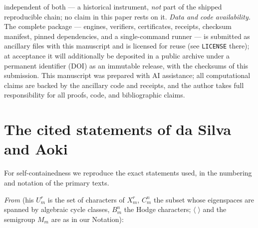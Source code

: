 \documentclass[11pt]{amsart}
\theoremstyle{remark}
\begin{document}
independent of both --- a historical instrument, \emph{not} part of the shipped reproducible
chain; no claim in this paper rests on it. \emph{Data and code availability.} The complete package --- engines, verifiers, certificates,
receipts, checksum manifest, pinned dependencies, and a single-command runner --- is submitted
as ancillary files with this manuscript and is licensed for reuse (see \texttt{LICENSE} there);
at acceptance it will additionally be deposited in a public archive under a permanent
identifier (DOI) as an immutable release, with the checksums of this submission. This
manuscript was prepared with AI assistance; all computational claims are backed by the
ancillary code and receipts, and the author takes full responsibility for all proofs, code, and
bibliographic claims.

\appendix
\section{The cited statements of da Silva and Aoki}\label{app:aoki}

For self-containedness we reproduce the exact statements used, in the numbering and notation of
the primary texts.

\emph{From \cite{daSilva}} (his $U^r_m$ is the set of characters of $X^r_m$, $C^n_m$ the
subset whose eigenspaces are spanned by algebraic cycle classes, $B^n_m$ the Hodge characters;
$\langle\;\rangle$ and the semigroup $M_m$ are as in our Notation):
\end{document}
